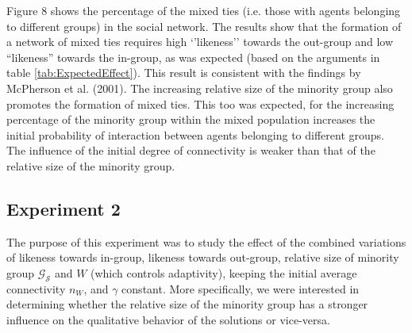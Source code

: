 Figure 8 shows the percentage of the mixed ties (i.e. those with agents belonging to different groups) in the social network. The results show that the formation of a network of mixed ties requires high `'likeness'' towards the out-group and low ``likeness'' towards the in-group, as was expected (based on the arguments in table \ref{tab:ExpectedEffect}). This result is consistent with the findings by McPherson et al. (2001). The increasing relative size of the minority group also promotes the formation of mixed ties. This too was expected, for the increasing percentage of the minority group within the mixed population increases the initial probability of interaction between agents belonging to different groups. The influence of the initial degree of connectivity is weaker than that of the relative size of the minority group.


\subsection{Experiment 2}
The purpose of this experiment was to study the effect of the combined variations of likeness towards in-group, likeness towards out-group, relative size of minority group $ \mathcal{G}_{\mathcal{S}} $ and $ W $ (which controls adaptivity), keeping the initial average connectivity $ n_{W} $, and  $ \gamma $ constant. More specifically, we were interested in determining whether the relative size of the minority group has a stronger influence on the qualitative behavior of the solutions or vice-versa.

